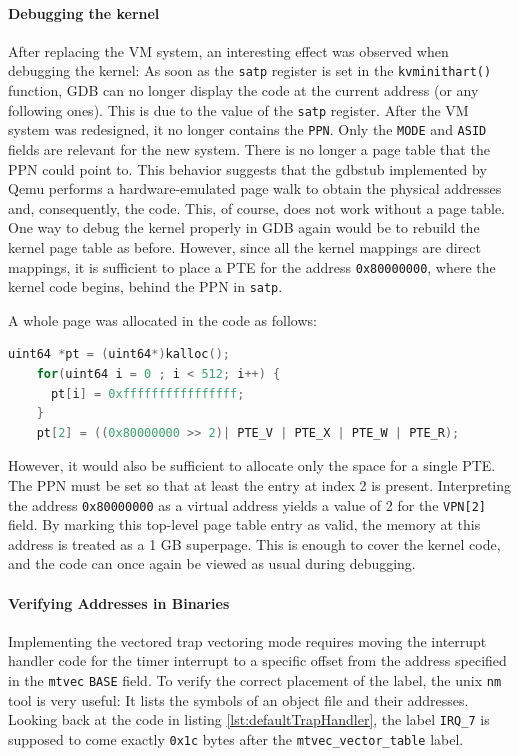 \paragraph{Debugging the kernel} After replacing the VM system, an interesting effect was observed when debugging the kernel: As soon as the \texttt{satp} register is set in the \texttt{kvminithart()} function, GDB can no longer display the code at the current address (or any following ones). This is due to the value of the \texttt{satp} register. After the VM system was redesigned, it no longer contains the \texttt{PPN}. Only the \texttt{MODE} and \texttt{ASID} fields are relevant for the new system. There is no longer a page table that the PPN could point to. This behavior suggests that the gdbstub implemented by Qemu performs a hardware-emulated page walk to obtain the physical addresses and, consequently, the code. This, of course, does not work without a page table. One way to debug the kernel properly in GDB again would be to rebuild the kernel page table as before. However, since all the kernel mappings are direct mappings, it is sufficient to place a PTE for the address \texttt{0x80000000}, where the kernel code begins, behind the PPN in \texttt{satp}.

A whole page was allocated in the code as follows:
\begin{lstlisting}[language=c,float=h!, label={lst:fake_pt},basicstyle=\footnotesize]
    uint64 *pt = (uint64*)kalloc();
    for(uint64 i = 0 ; i < 512; i++) {
      pt[i] = 0xffffffffffffffff;
    }
    pt[2] = ((0x80000000 >> 2)| PTE_V | PTE_X | PTE_W | PTE_R);
\end{lstlisting}
However, it would also be sufficient to allocate only the space for a single PTE. The PPN must be set so that at least the entry at index 2 is present. Interpreting the address \texttt{0x80000000} as a virtual address yields a value of 2 for the \texttt{VPN[2]} field. By marking this top-level page table entry as valid, the memory at this address is treated as a 1 GB superpage. This is enough to cover the kernel code, and the code can once again be viewed as usual during debugging.

\paragraph{Verifying Addresses in Binaries} Implementing the vectored trap vectoring mode
requires moving the interrupt handler code for the timer interrupt to a specific offset
from the address specified in the \texttt{mtvec} \texttt{BASE} field.
To verify the correct placement of the label, the unix \texttt{nm} tool is very useful:
It lists the symbols of an object file and their addresses.
Looking back at the code in listing \ref{lst:defaultTrapHandler}, the label \texttt{IRQ\_7}
is supposed to come exactly \texttt{0x1c} bytes after the \texttt{mtvec\_vector\_table} label.

